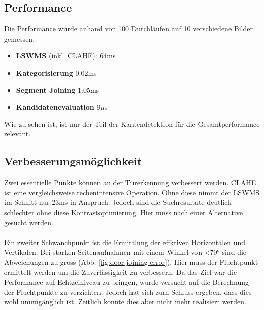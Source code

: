 \subsection{Performance}
Die Performance wurde anhand von 100 Durchläufen auf 10 verschiedene Bilder gemessen.

\begin{itemize}
	\item \textbf{LSWMS} (inkl. CLAHE): 64ms
	\item \textbf{Kategorisierung} 0.02ms
	\item \textbf{Segment Joining} 1.05ms
	\item \textbf{Kandidatenevaluation} 9$\mu$s
\end{itemize}

\noindent
Wie zu sehen ist, ist nur der Teil der Kantendetektion für die Gesamtperformance relevant. 

\subsection{Verbesserungsmöglichkeit}
Zwei essentielle Punkte können an der Türerkennung verbessert werden. CLAHE ist eine vergleichsweise rechenintensive Operation. Ohne diese nimmt der LSWMS im Schnitt nur 23ms in Anspruch. Jedoch sind die Suchresultate deutlich schlechter ohne diese Kontrastoptimierung. Hier muss nach einer Alternative gesucht werden.
\paragraph{}
Ein zweiter Schwanchpunkt ist die Ermittlung der effktiven Horizontalen und Vertikalen. Bei starken Seitenaufnahmen mit einem Winkel von <70° sind die Abweichungen zu gross (Abb. \ref{fig:door-joining-error}). Hier muss der Fluchtpunkt ermittelt werden um die Zuverlässigkeit zu verbessern. Da das Ziel war die Performance auf Echtzeiniveau zu bringen, wurde versucht auf die Berechnung der Fluchtpunkte zu verzichten. Jedoch hat sich zum Schluss ergeben, dass dies wohl unumgänglich ist. Zeitlich konnte dies aber nicht mehr realisiert werden.

